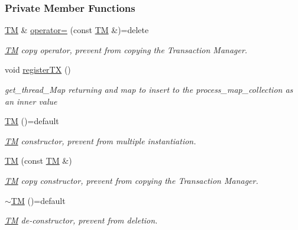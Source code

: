 \subsubsection*{Private Member Functions}
\begin{DoxyCompactItemize}
\item 
\hyperlink{class_t_m}{TM} \& \hyperlink{class_t_m_a85a6b783f0566f0877bab6a7de977c0a_a85a6b783f0566f0877bab6a7de977c0a}{operator=} (const \hyperlink{class_t_m}{TM} \&)=delete
\begin{DoxyCompactList}\small\item\em \hyperlink{class_t_m}{TM} copy operator, prevent from copying the Transaction Manager. \end{DoxyCompactList}\item 
void \hyperlink{class_t_m_a26ea481c24d9aa3aebd6dafb7253376e_a26ea481c24d9aa3aebd6dafb7253376e}{register\+TX} ()
\begin{DoxyCompactList}\small\item\em get\+\_\+thread\+\_\+\+Map returning and map to insert to the process\+\_\+map\+\_\+collection as an inner value \end{DoxyCompactList}\item 
\hyperlink{class_t_m_a9b5afb6b9d7c5925ab5cc5c65078ac23_a9b5afb6b9d7c5925ab5cc5c65078ac23}{TM} ()=default
\begin{DoxyCompactList}\small\item\em \hyperlink{class_t_m}{TM} constructor, prevent from multiple instantiation. \end{DoxyCompactList}\item 
\hyperlink{class_t_m_a466fc96ad2e1c681e178e3b58310f87c_a466fc96ad2e1c681e178e3b58310f87c}{TM} (const \hyperlink{class_t_m}{TM} \&)
\begin{DoxyCompactList}\small\item\em \hyperlink{class_t_m}{TM} copy constructor, prevent from copying the Transaction Manager. \end{DoxyCompactList}\item 
\hyperlink{class_t_m_a985f8cb24f685925ddd637c7030cd2b3_a985f8cb24f685925ddd637c7030cd2b3}{$\sim$\+TM} ()=default
\begin{DoxyCompactList}\small\item\em \hyperlink{class_t_m}{TM} de-\/constructor, prevent from deletion. \end{DoxyCompactList}\end{DoxyCompactItemize}

